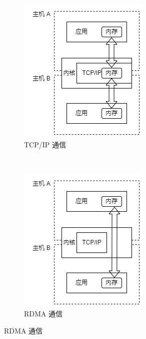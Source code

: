{\begin{figure}[!htbp]
\begin{subfigure}[b]{0.40\textwidth}
      \includegraphics[width=\textwidth]{Img/TCPIP.png}
      \caption{TCP/IP 通信}
      \label{fig:TCPIP}
    \end{subfigure}%
    ~~~~~%
    \begin{subfigure}[b]{0.40\textwidth}
      \includegraphics[width=\textwidth]{Img/RDMA.png}
      \caption{RDMA 通信}
      \label{fig:RDMA}
    \end{subfigure}
    \label{fig:DMA-RDMA}
\end{figure}

}
